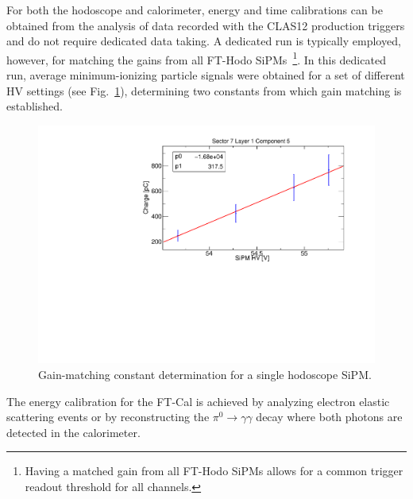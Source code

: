For both the hodoscope and calorimeter, energy and time calibrations can be obtained from the analysis of data
recorded with the CLAS12 production triggers and do not require dedicated data taking. A dedicated run is
typically employed, however, for matching the gains from all FT-Hodo SiPMs~\footnote{Having a matched gain
from all FT-Hodo SiPMs allows for a common trigger readout threshold for all channels.}. In this dedicated run,
average minimum-ionizing particle signals were obtained for a set of different HV settings (see
Fig.~\ref{fig:fthodo_gainmatch}), determining two constants from which gain matching is established.

\begin{figure}
\includegraphics[width=1.0\columnwidth]{fig/fthodo_gainmatch.pdf}
\caption{Gain-matching constant determination for a single hodoscope SiPM.}
\label{fig:fthodo_gainmatch}
\end{figure}

The energy calibration for the FT-Cal is achieved by analyzing electron elastic scattering events or by reconstructing
the $\pi^0\to\gamma\gamma$ decay where both photons are detected in the calorimeter. 

